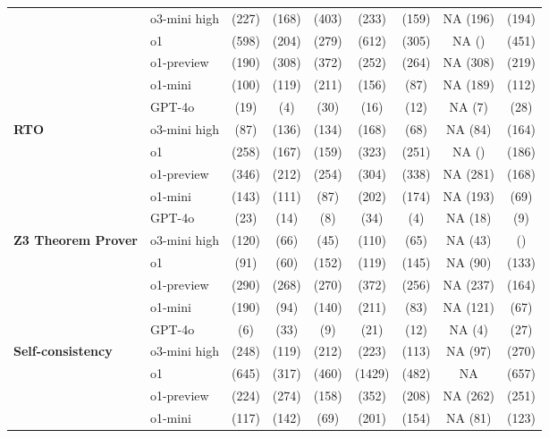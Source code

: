 \begin{table}[H]
\begin{tabular}{llccccccc}
& o3-mini high & \C (227) & \X (168) & \X (403) & \X (233) & \X (159) & NA (196) & \X (194) \\
& o1 & \X (598) & \X (204) & \X (279) & \C (612) & \X (305) & NA () & \X (451) \\
& o1-preview & \X (190) & \X (308) & \X (372) & \X (252) & \X (264) & NA (308) & \X (219)\\
& o1-mini & \X (100) & \X (119) & \X (211) & \X (156) & \X (87) & NA (189) & \X (112)\\
& GPT-4o & \X (19) & \X (4) & \X (30) & \X (16) & \X (12) & NA (7) & \X (28)\\
\midrule
\textbf{RTO} 
& o3-mini high & \C (87) & \X (136) & \X (134) & \C (168) & \C (68) & NA (84) & \X (164) \\
& o1 & \X (258) & \X (167) & \X (159) & \X (323) & \X (251) & NA () & \X (186) \\
& o1-preview & \X (346) & \X (212) & \X (254) & \X (304) & \X (338) & NA (281) & \X (168)\\
& o1-mini & \X (143) & \X (111) & \X (87) & \X (202) & \X (174) & NA (193) & \X (69)\\
& GPT-4o & \X (23) & \X (14) & \X (8) & \X (34) & \X (4) & NA (18) & \X (9)\\
\midrule
\textbf{Z3 Theorem Prover} 
& o3-mini high & \X (120) & \X (66) & \X (45) & \C (110) & \X (65) & NA (43) & \X () \\
& o1 & \X (91) & \X (60) & \X (152) & \C (119) & \X (145) & NA (90) & \X (133) \\
& o1-preview & \X (290) & \X (268) & \X (270) & \X (372) & \X (256) & NA (237) & \X (164)\\ 
& o1-mini & \X (190) & \X (94) & \X (140) & \X (211) & \X (83) & NA (121) & \X (67)\\ 
& GPT-4o & \X (6) & \X (33) & \X (9) & \X (21) & \X (12) & NA (4) & \X (27)\\
\midrule
\textbf{Self-consistency} 
& o3-mini high & \X (248) & \X (119) & \X (212) & \C (223) & \X (113) & NA (97) & \X (270) \\
& o1 & \X (645) & \X (317) & \X (460) & \C (1429) & \C (482) & NA & \X (657) \\
& o1-preview & \X (224) & \X (274) & \X (158) & \X (352) & \X (208) & NA (262) & \X (251)\\
& o1-mini & \X (117) & \X (142) & \X (69) & \X (201) & \X (154) & NA (81) & \X (123)\\

\end{tabular}
\end{table}
